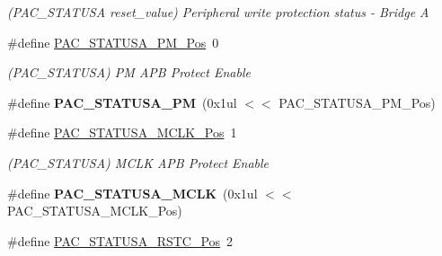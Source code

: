 \begin{DoxyCompactItemize}
\begin{DoxyCompactList}\small\item\em (P\+A\+C\+\_\+\+S\+T\+A\+T\+U\+S\+A reset\+\_\+value) Peripheral write protection status -\/ Bridge A \end{DoxyCompactList}\item 
\hypertarget{group___s_a_m_l21___p_a_c_ga2d5148e0330671373476773f906f94ac}{}\#define \hyperlink{group___s_a_m_l21___p_a_c_ga2d5148e0330671373476773f906f94ac}{P\+A\+C\+\_\+\+S\+T\+A\+T\+U\+S\+A\+\_\+\+P\+M\+\_\+\+Pos}~0\label{group___s_a_m_l21___p_a_c_ga2d5148e0330671373476773f906f94ac}

\begin{DoxyCompactList}\small\item\em (P\+A\+C\+\_\+\+S\+T\+A\+T\+U\+S\+A) P\+M A\+P\+B Protect Enable \end{DoxyCompactList}\item 
\hypertarget{group___s_a_m_l21___p_a_c_ga8f74c225efe6b73648fe9474d2269603}{}\#define {\bfseries P\+A\+C\+\_\+\+S\+T\+A\+T\+U\+S\+A\+\_\+\+P\+M}~(0x1ul $<$$<$ P\+A\+C\+\_\+\+S\+T\+A\+T\+U\+S\+A\+\_\+\+P\+M\+\_\+\+Pos)\label{group___s_a_m_l21___p_a_c_ga8f74c225efe6b73648fe9474d2269603}

\item 
\hypertarget{group___s_a_m_l21___p_a_c_ga360a83771977e030a6fd87157c6bc13e}{}\#define \hyperlink{group___s_a_m_l21___p_a_c_ga360a83771977e030a6fd87157c6bc13e}{P\+A\+C\+\_\+\+S\+T\+A\+T\+U\+S\+A\+\_\+\+M\+C\+L\+K\+\_\+\+Pos}~1\label{group___s_a_m_l21___p_a_c_ga360a83771977e030a6fd87157c6bc13e}

\begin{DoxyCompactList}\small\item\em (P\+A\+C\+\_\+\+S\+T\+A\+T\+U\+S\+A) M\+C\+L\+K A\+P\+B Protect Enable \end{DoxyCompactList}\item 
\hypertarget{group___s_a_m_l21___p_a_c_gaa2bb74f906a208604e51df4386ffd323}{}\#define {\bfseries P\+A\+C\+\_\+\+S\+T\+A\+T\+U\+S\+A\+\_\+\+M\+C\+L\+K}~(0x1ul $<$$<$ P\+A\+C\+\_\+\+S\+T\+A\+T\+U\+S\+A\+\_\+\+M\+C\+L\+K\+\_\+\+Pos)\label{group___s_a_m_l21___p_a_c_gaa2bb74f906a208604e51df4386ffd323}

\item 
\hypertarget{group___s_a_m_l21___p_a_c_ga72d085783a9e1a35516e156489fc8857}{}\#define \hyperlink{group___s_a_m_l21___p_a_c_ga72d085783a9e1a35516e156489fc8857}{P\+A\+C\+\_\+\+S\+T\+A\+T\+U\+S\+A\+\_\+\+R\+S\+T\+C\+\_\+\+Pos}~2\label{group___s_a_m_l21___p_a_c_ga72d085783a9e1a35516e156489fc8857}


\end{DoxyCompactItemize}
